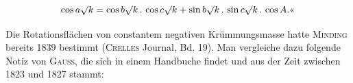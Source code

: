 \[
\cos a\mathord{\surd}k = \cos b\mathord{\surd}k \,.\, \cos c\mathord{\surd}k + \sin b\mathord{\surd}k \,.\, \sin c\mathord{\surd}k \,.\, \cos A.\text{«}
\]

Die Rotationsflächen von constantem negativen Krümmungsmasse hatte \textsc{Minding} bereits 1839 bestimmt (\textsc{Crelles} Journal, Bd. 19). Man vergleiche dazu folgende Notiz von \textsc{Gauss}, die sich in einem Handbuche findet und aus der Zeit zwischen 1823 und 1827 stammt:

